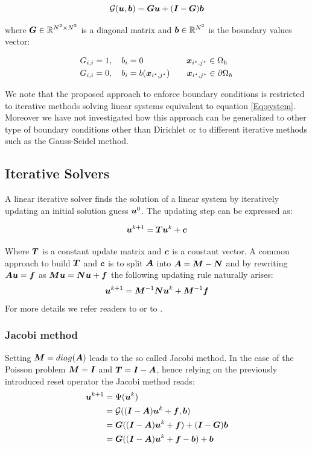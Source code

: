 \documentclass{rescience} %
\begin{document}
\begin{equation*}
    \mathcal{G}({\bm{u}}, {\bm{b}}) = {\bm{G}} {\bm{u}} + ({\bm{I}}-{\bm{G}}){\bm{b}}
\end{equation*}

where ${\bm{G}} \in {\mathbb{R}}^{N^2\times N^2}$ is a diagonal matrix and ${\bm{b}} \in {\mathbb{R}}^{N^2}$ is the boundary values vector:

\begin{align*}
    {G}_{i,i} &= 1, \quad {b}_{i} = 0 \quad \; \quad \;\;\;\quad \quad {\bm{x}}_{i^{\star},j^{\star}}\in \Omega_h \\
    {G}_{i,i} &= 0, \quad {b}_{i} = b({\bm{x}}_{i^{\star},j^{\star}})  \qquad {\bm{x}}_{i^{\star},j^{\star}}\in \partial\Omega_h
\end{align*}

We note that the proposed approach to enforce boundary conditions is restricted to iterative methods solving linear systems equivalent to equation \ref{Eq:system}.
Moreover we have not investigated how this approach can be generalized to other type of boundary conditions other than Dirichlet or to different iterative methods such as the Gauss-Seidel method.

\subsection{Iterative Solvers}
A linear iterative solver finds the solution of a linear system by iteratively updating an initial solution guess ${\bm{u}}^0$.
The updating step can be expressed as:

\begin{equation*}
{\bm{u}}^{k+1} = {\bm{T}}{\bm{u}}^k + {\bm{c}}
\end{equation*}

Where ${\bm{T}}$ is a constant update matrix and ${\bm{c}}$ is a constant vector.
A common approach to build ${\bm{T}}$ and ${\bm{c}}$ is to split ${\bm{A}}$ into ${\bm{A}} = {\bm{M}}-{\bm{N}}$ and by rewriting ${\bm{A}}{\bm{u}}={\bm{f}}$ as ${\bm{M}}{\bm{u}}={\bm{N}}{\bm{u}} + {\bm{f}}$ the following updating rule naturally arises:
\begin{equation*}
{\bm{u}}^{k+1} = {\bm{M}}^{-1}{\bm{N}}{\bm{u}}^k + {\bm{M}}^{-1}{\bm{f}}
\end{equation*}
For more details we refer readers to \cite{leveque} or to \cite{original_paper}.

\subsubsection{Jacobi method}
Setting ${\bm{M}} = diag({\bm{A}})$ leads to the so called Jacobi method. In the case of the Poisson problem ${\bm{M}}={\bm{I}}$ and ${\bm{T}}={\bm{I}}-{\bm{A}}$, hence relying on the previously introduced reset operator the Jacobi method reads:
\begin{align*}
{\bm{u}}^{k+1} &= \Psi({\bm{u}}^k)\\
          &= \mathcal{G}(({\bm{I}}-{\bm{A}}){\bm{u}}^k + {\bm{f}}, {\bm{b}})\\
          &= {\bm{G}}(({\bm{I}}-{\bm{A}}){\bm{u}}^k + {\bm{f}}) + ({\bm{I}}-{\bm{G}}){\bm{b}}\\
          &= {\bm{G}}(({\bm{I}}-{\bm{A}}){\bm{u}}^k + {\bm{f}}-{\bm{b}}) + {\bm{b}}
\label{jacobiMatrix}
\end{align*}
\end{document}
